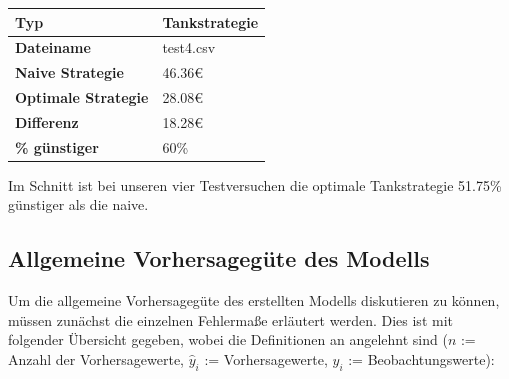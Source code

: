 \documentclass[
ngerman          %
,a4paper          %
,11pt
,pdftex
]{report}
\begin{document}
\begin{table}[H]
	\centering
	\begin{tabular}{l l}
		\textbf{Typ} & \textbf{Tankstrategie} \\ 
		\hline
		\hline
		\textbf{Dateiname} & test4.csv \\
        \textbf{Naive Strategie} & 46.36\euro{} \\
        \textbf{Optimale Strategie} & 28.08\euro{} \\
  		\textbf{Differenz} & 18.28\euro{} \\
        \textbf{\% günstiger} & 60\% \\
		\hline 
	\end{tabular}
\end{table} 

Im Schnitt ist bei unseren vier Testversuchen die optimale Tankstrategie 51.75\% günstiger als die naive.

\subsection{Allgemeine Vorhersagegüte des Modells}

Um die allgemeine Vorhersagegüte des erstellten Modells diskutieren zu können, müssen zunächst die einzelnen Fehlermaße erläutert werden. Dies ist mit folgender Übersicht gegeben, wobei die Definitionen an \cite{maermse} angelehnt sind ($n$ := Anzahl der Vorhersagewerte, $\hat{y}_i$ := Vorhersagewerte, $y_i$ := Beobachtungswerte):
\end{document}
